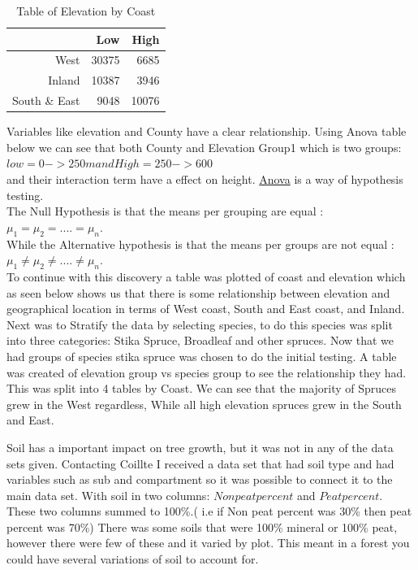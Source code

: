 \documentclass[a4paper,11pt,twoside]{report}
\begin{document}
\begin{table}[ht]
\centering
\caption{Table of Elevation by Coast}
\begin{tabular}{rrr}
  \hline
 & Low & High \\ 
  \hline
West & 30375 & 6685 \\ 
  Inland & 10387 & 3946 \\ 
  South \& East & 9048 & 10076 \\ 
   \hline
\end{tabular}
\end{table}

Variables like elevation and County have a clear relationship. Using Anova table below we can see that both County and Elevation Group1
which is two groups:\\
$low = 0 -> 250m and High = 250->600$\\
and their interaction term have a effect on height. \href{https://www.itl.nist.gov/div898/handbook/prc/section4/prc433.htm}{Anova} is a way of hypothesis testing.\\
The Null Hypothesis is that the means per grouping are equal :
$\mu_1 = \mu_2 = .... = \mu_n$. \\
While the Alternative hypothesis is that the means per groups are not equal : $\mu_1 \neq \mu_2 \neq .... \neq \mu_n$.\\
To continue with this discovery a table was plotted of coast and elevation which as seen below shows us that there is some relationship between elevation and geographical location in terms of West coast, South and East coast, and Inland.
Next was to Stratify the data by selecting species, to do this species was split into three categories: Stika Spruce, Broadleaf and other spruces. Now that we had groups of species stika spruce was chosen to do the initial testing. A table was created of elevation group vs species group to see the relationship they had. This was split into 4 tables by Coast. We can see that the majority of Spruces grew in the West regardless, While all high elevation spruces grew in the South and East.

Soil has a important impact on tree growth, but it was not in any of the data sets given. Contacting Coillte I received a data set that had soil type and had variables such as sub and compartment so it was possible to connect it to the main data set. With soil in two columns: $Non peat percent$ and $Peat percent$. \\
These two columns summed to 100\%.( i.e if  Non peat percent was 30\% then peat percent was 70\%) There was some soils that were 100\% mineral or 100\% peat, however there were few of these and it varied by plot. This meant in a forest you could have several variations of soil to account for.
\end{document}
